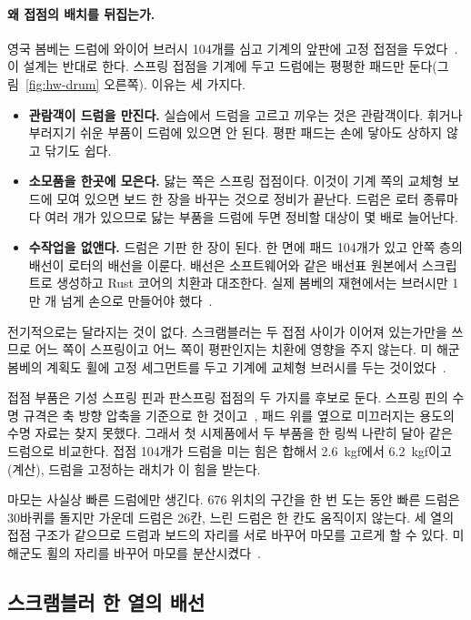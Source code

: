 \paragraph{왜 접점의 배치를 뒤집는가.} 영국 봄베는 드럼에 와이어 브러시 104개를 심고 기계의 앞판에 고정
접점을 두었다~\cite{us6812report1944}. 이 설계는 반대로 한다. 스프링 접점을 기계에 두고 드럼에는 평평한 패드만
둔다(그림~\ref{fig:hw-drum} 오른쪽). 이유는 세 가지다.

\begin{itemize}
\item \textbf{관람객이 드럼을 만진다.} 실습에서 드럼을 고르고 끼우는 것은 관람객이다. 휘거나 부러지기 쉬운
부품이 드럼에 있으면 안 된다. 평판 패드는 손에 닿아도 상하지 않고 닦기도 쉽다.
\item \textbf{소모품을 한곳에 모은다.} 닳는 쪽은 스프링 접점이다. 이것이 기계 쪽의 교체형 보드에 모여 있으면
보드 한 장을 바꾸는 것으로 정비가 끝난다. 드럼은 로터 종류마다 여러 개가 있으므로 닳는 부품을 드럼에 두면
정비할 대상이 몇 배로 늘어난다.
\item \textbf{수작업을 없앤다.} 드럼은 기판 한 장이 된다. 한 면에 패드 104개가 있고 안쪽 층의 배선이 로터의
배선을 이룬다. 배선은 소프트웨어와 같은 배선표 원본에서 스크립트로 생성하고 Rust 코어의 치환과 대조한다.
실제 봄베의 재현에서는 브러시만 1만 개 넘게 손으로 만들어야 했다~\cite{bombe-rebuild-brushes,jackson-bh07}.
\end{itemize}

전기적으로는 달라지는 것이 없다. 스크램블러는 두 접점 사이가 이어져 있는가만을 쓰므로 어느 쪽이 스프링이고
어느 쪽이 평판인지는 치환에 영향을 주지 않는다. 미 해군 봄베의 계획도 휠에 고정 세그먼트를 두고 기계에
교체형 브러시를 두는 것이었다~\cite{desch1942memo}.

접점 부품은 기성 스프링 핀과 판스프링 접점의 두 가지를 후보로 둔다. 스프링 핀의 수명 규격은 축 방향 압축을
기준으로 한 것이고~\cite{millmax-springpin}, 패드 위를 옆으로 미끄러지는 용도의 수명 자료는 찾지 못했다.
그래서 첫 시제품에서 두 부품을 한 링씩 나란히 달아 같은 드럼으로 비교한다. 접점 104개가 드럼을 미는 힘은
합해서 2.6~kgf에서 6.2~kgf이고(계산), 드럼을 고정하는 래치가 이 힘을 받는다.

마모는 사실상 빠른 드럼에만 생긴다. 676 위치의 구간을 한 번 도는 동안 빠른 드럼은 30바퀴를 돌지만 가운데
드럼은 26칸, 느린 드럼은 한 칸도 움직이지 않는다. 세 열의 접점 구조가 같으므로 드럼과 보드의 자리를 서로
바꾸어 마모를 고르게 할 수 있다. 미 해군도 휠의 자리를 바꾸어 마모를 분산시켰다~\cite{desch1942memo}.

\subsection{스크램블러 한 열의 배선}

